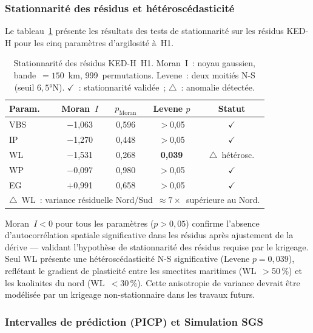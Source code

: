 \documentclass[10pt,a4paper,twocolumn]{article}
\begin{document}
	\subsubsection{Stationnarité des résidus et hétéroscédasticité}
	\label{subsec:stationnarite}

	Le tableau~\ref{tab:stationnarite} présente les résultats des tests
	de stationnarité sur les résidus KED-H pour les cinq paramètres
	d'argilosité à~H1.

	\begin{table}[htbp]
		\centering\small
		\caption{Stationnarité des résidus KED-H~H1.
			Moran~I~: noyau gaussien, bande~$=150$~km, 999~permutations.
			Levene~: deux moitiés N-S (seuil $6{,}5°$N).
			$\checkmark$~: stationnarité validée~; $\triangle$~: anomalie détectée.}
		\label{tab:stationnarite}
		\begin{tabular}{lcccc}
			\toprule
			Param. & Moran~$I$ & $p_{\mathrm{Moran}}$ & Levene $p$ & Statut \\
			\midrule
			VBS & $-$1{,}063 & 0{,}596 & $>$0{,}05 & $\checkmark$ \\
			IP  & $-$1{,}270 & 0{,}448 & $>$0{,}05 & $\checkmark$ \\
			WL  & $-$1{,}531 & 0{,}268 & \textbf{0{,}039} &
			$\triangle$~hétérosc. \\
			WP  & $-$0{,}097 & 0{,}980 & $>$0{,}05 & $\checkmark$ \\
			EG  & $+$0{,}991 & 0{,}658 & $>$0{,}05 & $\checkmark$ \\
			\bottomrule
			\multicolumn{5}{l}{\footnotesize $\triangle$~WL~: variance
			résiduelle Nord/Sud~$\approx7\times$~supérieure au Nord.}
		\end{tabular}
	\end{table}

	Moran~$I<0$ pour tous les paramètres ($p>0{,}05$) confirme
	l'absence d'autocorrélation spatiale significative dans les résidus
	après ajustement de la dérive --- validant l'hypothèse de
	stationnarité des résidus requise par le krigeage.
	Seul WL présente une hétéroscédasticité N-S significative
	(Levene $p=0{,}039$), reflétant le gradient de plasticité entre
	les smectites maritimes (WL~$>$50\,\%) et les kaolinites du nord
	(WL~$<$30\,\%). Cette anisotropie de variance devrait être
	modélisée par un krigeage non-stationnaire dans les travaux futurs.

	\subsubsection{Intervalles de prédiction (PICP) et Simulation SGS}
	\label{subsec:picp_sgs}
\end{document}

